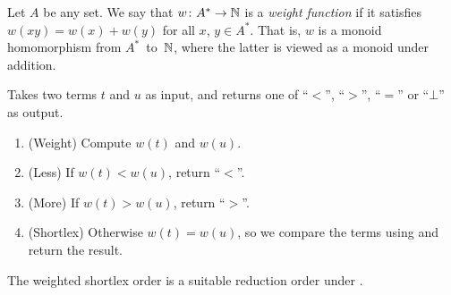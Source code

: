 \documentclass[../generics]{subfiles}
\begin{document}
\begin{definition}
Let $A$ be any set. We say that $w\colon A^*\rightarrow\mathbb{N}$ is a \emph{weight function} if it satisfies $w(xy)=w(x)+w(y)$ for all $x$, $y\in A^*$. That is, $w$ is a monoid homomorphism from $A^*$~to~$\mathbb{N}$, where the latter is viewed as a monoid under addition.
\end{definition}

\begin{algorithm}\label{rqm reduction order}
Takes two terms $t$ and $u$ as input, and returns one of ``$<$'', ``$>$'', ``$=$'' or \index{$\bot$}``$\bot$'' as output.
\begin{enumerate}
\item (Weight) Compute $w(t)$ and $w(u)$.
\item (Less) If $w(t)<w(u)$, return ``$<$''.
\item (More) If $w(t)>w(u)$, return ``$>$''.
\item (Shortlex) Otherwise $w(t)=w(u)$, so we compare the terms using  and return the result.
\end{enumerate}
\end{algorithm}

The weighted shortlex order is a suitable reduction order under .
\end{document}
